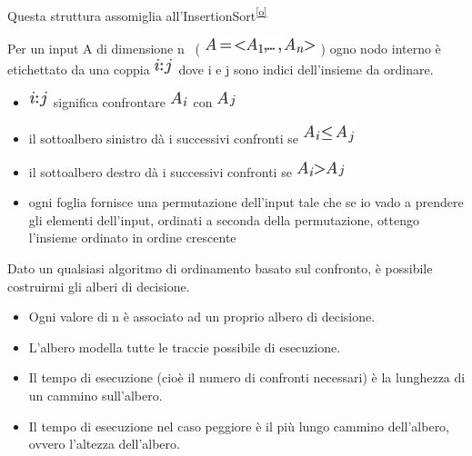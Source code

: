 \documentclass{article}
\providecommand{\tightlist}{%
  \setlength{\itemsep}{0pt}\setlength{\parskip}{0pt}}
\begin{document}
{Questa struttura assomiglia
all'InsertionSort}\textsuperscript{\protect\hyperlink{cmnt15}{{[}o{]}}}

{}

{Per un input A di dimensione n ~(
}\includegraphics{images/image154.png}{~) ogno nodo interno è
etichettato da una coppia }\includegraphics{images/image155.png}{~}{dove
i e j sono indici dell'insieme da ordinare.}

\begin{itemize}
\tightlist
\item
  \includegraphics{images/image155.png}{~significa confrontare
  }\includegraphics{images/image156.png}{~con
  }\includegraphics{images/image157.png}
\item
  {il sottoalbero sinistro dà i successivi confronti se
  }\includegraphics{images/image158.png}{~}
\item
  {il sottoalbero destro dà i successivi confronti se
  }\includegraphics{images/image159.png}{~}
\item
  {ogni foglia fornisce una permutazione dell'input tale che se io vado a prendere gli elementi dell'input, ordinati a seconda della permutazione, ottengo l'insieme ordinato in ordine crescente}
\end{itemize}

{Dato un qualsiasi algoritmo di ordinamento basato sul confronto, è
possibile costruirmi gli alberi di decisione.}

\begin{itemize}
\tightlist
\item
  {Ogni valore di n è associato ad un proprio albero di decisione.}
\item
  {L'albero modella tutte le traccie possibile di esecuzione.}
\item
  {Il tempo di esecuzione (cioè il numero di confronti necessari) è la
  lunghezza di un cammino sull'albero.}
\item
  {Il tempo di esecuzione nel caso peggiore è il più lungo cammino
  dell'albero, }{ovvero l'altezza dell'albero.}
\end{itemize}
\end{document}
